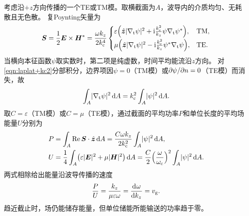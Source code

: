 考虑沿$+z$方向传播的一个TE或TM模。取横截面为$A$，波导内的介质均匀、无耗散且无色散。
复Poynting矢量为
\begin{equation}
    \bm S = \frac12\bm E \times \bm H^\ast = \frac{\omega k_z}{2k_\mathrm c^4}
    \begin{cases}
        \varepsilon\Bigl(\mathop{}\!\hat{\bm{z}}\lvert\nabla_\mathrm t\psi\rvert^2 + \mathrm{i}\frac{k_\mathrm c^2}{k_z}\psi\nabla_\mathrm t\psi^\ast\Bigr),&\mathrm{TM},\\[1ex]
        \mu\Bigl(\mathop{}\!\hat{\bm{z}}\lvert\nabla_\mathrm t\psi\rvert^2 - \mathrm{i}\frac{k_\mathrm c^2}{k_z}\psi^\ast\nabla_\mathrm t\psi\Bigr),&\mathrm{TE}.
    \end{cases}
\end{equation}
当横向本征函数$\psi$取实数时，第二项是纯虚数，时间平均能流沿$z$方向。
对\eqref{eqn:laplat+kc2}分部积分，边界项因$\psi = 0$（TM模）或$\partial\psi/\partial n = 0$（TE模）而消失，故
\[
    \int_A\lvert\nabla_\mathrm t\psi\rvert^2\mathop{}\!\mathrm{d} A = k_\mathrm c^2\int_A\lvert\psi\rvert^2\mathop{}\!\mathrm{d} A.
\]
取$C = \varepsilon$（TM模）或$C = \mu$（TE模），通过截面的平均功率$P$和单位长度的平均场能量$U$分别为
\begin{subequations}
    \label{eq:ed-waveguide-power-energy}
    \begin{align}
        P &= \int_A\operatorname{Re}\bm S \cdot \mathop{}\!\hat{\bm{z}}\mathop{}\!\mathrm{d} A
          = \frac{C\omega k_z}{2k_\mathrm c^2}\int_A\lvert\psi\rvert^2\mathop{}\!\mathrm{d} A,\\
        U &= \frac14\int_A\bigl(\varepsilon\lvert\bm E\rvert^2 + \mu\lvert\bm H\rvert^2\bigr)\mathop{}\!\mathrm{d} A
          = \frac C2\Bigl(\frac{\omega}{\omega_\mathrm c}\Bigr)^2\int_A\lvert\psi\rvert^2\mathop{}\!\mathrm{d} A.
    \end{align}
\end{subequations}
两式相除给出能量沿波导传播的速度
\begin{equation}
    \frac PU = \frac{k_z}{\mu\varepsilon\omega} = \frac{\mathop{}\!\mathrm{d}^{}\omega}{\mathrm{d}{k_z}^{}} = v_{\mathrm g}.
\end{equation}
趋近截止时，场仍能储存能量，但单位储能所能输送的功率趋于零。


